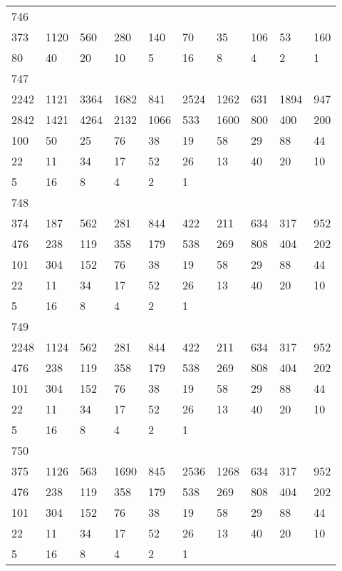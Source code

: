 \begin{longtable}{*{10}{l}}
746&&&&&&&&&\\
373& 1120& 560& 280& 140& 70& 35& 106& 53& 160\\
80& 40& 20& 10& 5& 16& 8& 4& 2& 1\\

747&&&&&&&&&\\
2242& 1121& 3364& 1682& 841& 2524& 1262& 631& 1894& 947\\
2842& 1421& 4264& 2132& 1066& 533& 1600& 800& 400& 200\\
100& 50& 25& 76& 38& 19& 58& 29& 88& 44\\
22& 11& 34& 17& 52& 26& 13& 40& 20& 10\\
5& 16& 8& 4& 2& 1& \\

748&&&&&&&&&\\
374& 187& 562& 281& 844& 422& 211& 634& 317& 952\\
476& 238& 119& 358& 179& 538& 269& 808& 404& 202\\
101& 304& 152& 76& 38& 19& 58& 29& 88& 44\\
22& 11& 34& 17& 52& 26& 13& 40& 20& 10\\
5& 16& 8& 4& 2& 1& \\

749&&&&&&&&&\\
2248& 1124& 562& 281& 844& 422& 211& 634& 317& 952\\
476& 238& 119& 358& 179& 538& 269& 808& 404& 202\\
101& 304& 152& 76& 38& 19& 58& 29& 88& 44\\
22& 11& 34& 17& 52& 26& 13& 40& 20& 10\\
5& 16& 8& 4& 2& 1& \\

750&&&&&&&&&\\
375& 1126& 563& 1690& 845& 2536& 1268& 634& 317& 952\\
476& 238& 119& 358& 179& 538& 269& 808& 404& 202\\
101& 304& 152& 76& 38& 19& 58& 29& 88& 44\\
22& 11& 34& 17& 52& 26& 13& 40& 20& 10\\
5& 16& 8& 4& 2& 1& \\


\end{longtable}
